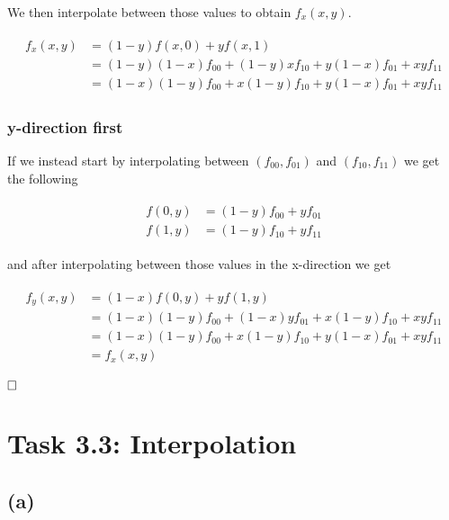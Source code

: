 \documentclass[paper=a4, fontsize=11pt]{scrartcl} %
\numberwithin{equation}{section} %
\numberwithin{figure}{section} %
\numberwithin{table}{section} %
\begin{document}
We then interpolate between those values to obtain $f_x(x, y)$.

\begin{align*}
  \begin{split}
    f_x(x, y) &= (1 - y)f(x, 0) + yf(x, 1)\\
		   &= (1 - y)(1 - x)f_{00} + (1 - y)xf_{10} + y(1 - x)f_{01} + xyf_{11}\\
    &= (1-x)(1-y)f_{00} + x(1 - y)f_{10} + y(1 - x)f_{01} + xyf_{11}
  \end{split}
\end{align*}

\subsubsection*{y-direction first}

If we instead start by interpolating between $(f_{00}, f_{01})$ and $(f_{10}, f_{11})$ we get the following

\begin{align*}
  \begin{split}
    f(0, y) &= (1 - y)f_{00} + yf_{01}\\
    f(1, y) &= (1 - y)f_{10} + yf_{11}
  \end{split}
\end{align*}

and after interpolating between those values in the x-direction we get

\begin{align*}
  \begin{split}
    f_y(x, y) &= (1 - x)f(0, y) + yf(1, y)\\
	    &= (1 - x)(1 - y)f_{00} + (1 - x)yf_{01} + x(1 - y)f_{10} + xyf_{11}\\
     &= (1-x)(1-y)f_{00} + x(1 - y)f_{10} + y(1 - x)f_{01} + xyf_{11}\\
    &= f_x(x, y)
  \end{split}
\end{align*}

$\hfill\square$

\section*{Task 3.3: Interpolation}

\subsection*{(a)}
\end{document}
